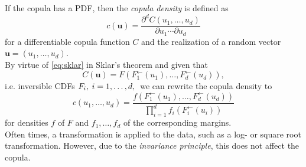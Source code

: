 If the copula has a \ac{PDF}, then the \textit{copula density} is defined as
\begin{equation}
c(\mathbf{u})=\frac{\partial^{d} C\left(u_{1}, \ldots, u_{d}\right)}{\partial u_{1} \cdots \partial u_{d}} 
\label{eq:copula_density_1}
\end{equation}
for a differentiable copula function $C$ and the realization of a random vector $ \bm{u} = (u_1, \ldots, u_d)$.\\
By virtue of \autoref{eq:sklar} in Sklar's theorem and given that
\begin{equation} 
C(\mathbf{u})=F\left(F_{1}^{\leftarrow}\left(u_{1}\right), \ldots, F_{d}^{\leftarrow}\left(u_{d}\right)\right) ,
\label{eq:sklar_2}
\end{equation}
i.e. inversible \ac{CDF}s $ F_i, \hspace{0.25em} i = 1, \ldots, d, \hspace{0.25em}$ we can rewrite the copula density to
\begin{equation}
c\left(u_{1}, \ldots, u_{d}\right)=\frac{f\left(F_{1}^{\leftarrow}\left(u_{1}\right), \ldots, F_{d}^{\leftarrow}\left(u_{d}\right)\right)}{\prod \limits _{i=1}^{d} f_{i}\left(F_{i}^{\leftarrow}\left(u_{i}\right)\right)}
\label{eq:copula_density_2}
\end{equation}
for densities $f$ of $F$ and $f_1, \ldots, f_d$ of the corresponding margins.\\



Often times, a transformation is applied to the data, such as a log- or square root transformation. However, due to the \textit{invariance principle}, this does not affect the copula.\\

